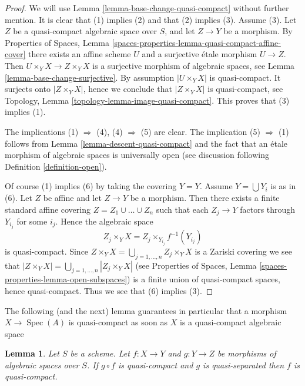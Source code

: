 \documentclass{stacks-project}
\theoremstyle{plain}
\newtheorem{lemma}[subsection]{Lemma}
\theoremstyle{definition}
\theoremstyle{remark}
\numberwithin{equation}{subsection}
\def\Spec{\mathop{\mathrm{Spec}}}
\begin{document}
\begin{proof}
We will use Lemma \ref{lemma-base-change-quasi-compact}
without further mention.
It is clear that (1) implies (2) and that (2) implies (3).
Assume (3). Let $Z$ be a quasi-compact algebraic space over $S$,
and let $Z \to Y$ be a morphism. By
Properties of Spaces, Lemma
\ref{spaces-properties-lemma-quasi-compact-affine-cover}
there exists an affine scheme $U$ and a surjective \'etale morphism
$U \to Z$. Then $U \times_Y X \to Z \times_Y X$ is a surjective
morphism of algebraic spaces, see
Lemma \ref{lemma-base-change-surjective}.
By assumption $|U \times_Y X|$ is quasi-compact. It surjects
onto $|Z \times_Y X|$, hence we conclude that $|Z \times_Y X|$
is quasi-compact, see
Topology, Lemma \ref{topology-lemma-image-quasi-compact}.
This proves that (3) implies (1).

\medskip\noindent
The implications (1) $\Rightarrow$ (4), (4) $\Rightarrow$ (5) are clear.
The implication (5) $\Rightarrow$ (1) follows from
Lemma \ref{lemma-descent-quasi-compact}
and the fact that an \'etale morphism of algebraic spaces is universally open
(see discussion following
Definition \ref{definition-open}).

\medskip\noindent
Of course (1) implies (6) by taking the covering $Y = Y$.
Assume $Y = \bigcup Y_i$ is as in (6). Let $Z$ be affine and let
$Z \to Y$ be a morphism. Then there exists a finite standard affine
covering $Z = Z_1 \cup \ldots \cup Z_n$ such that each $Z_j \to Y$
factors through $Y_{i_j}$ for some $i_j$. Hence the algebraic space
$$
Z_j \times_Y X = Z_j \times_{Y_{i_j}} f^{-1}(Y_{i_j})
$$
is quasi-compact. Since
$Z \times_Y X = \bigcup_{j = 1, \ldots, n} Z_j \times_Y X$
is a Zariski covering we see that
$|Z \times_Y X| = \bigcup_{j = 1, \ldots, n} |Z_j \times_Y X|$
(see Properties of Spaces, Lemma \ref{spaces-properties-lemma-open-subspaces})
is a finite union of quasi-compact spaces, hence quasi-compact.
Thus we see that (6) implies (3).
\end{proof}

\noindent
The following (and the next) lemma guarantees in particular that a morphism
$X \to \Spec(A)$ is quasi-compact as soon as
$X$ is a quasi-compact algebraic space

\begin{lemma}
\label{lemma-quasi-compact-permanence}
Let $S$ be a scheme.
Let $f : X \to Y$ and $g : Y \to Z$ be morphisms of algebraic spaces over $S$.
If $g \circ f$ is quasi-compact and $g$ is quasi-separated
then $f$ is quasi-compact.
\end{lemma}
\end{document}
